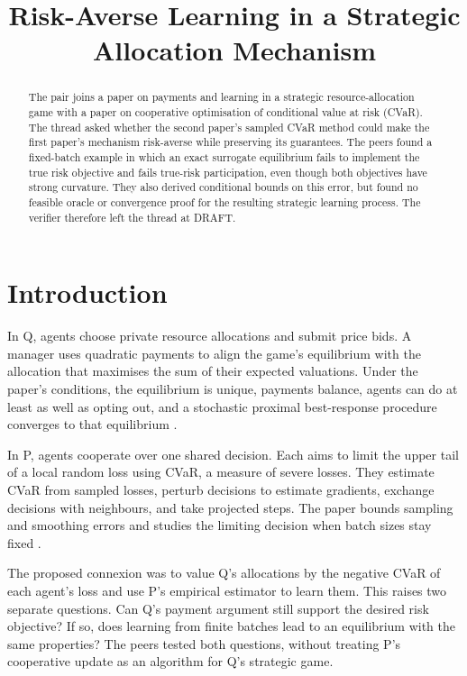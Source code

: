 \documentclass{article}
\title{Risk-Averse Learning in a Strategic Allocation Mechanism}
\begin{document}
\maketitle

\begin{abstract}
The pair joins a paper on payments and learning in a strategic resource-allocation game with a paper on
cooperative optimisation of conditional value at risk (CVaR). The thread asked whether the second paper's
sampled CVaR method could make the first paper's mechanism risk-averse while preserving its guarantees. The
peers found a fixed-batch example in which an exact surrogate equilibrium fails to implement the true risk
objective and fails true-risk participation, even though both objectives have strong curvature. They also
derived conditional bounds on this error, but found no feasible oracle or convergence proof for the
resulting strategic learning process. The verifier therefore left the thread at DRAFT.
\end{abstract}

\section{Introduction}

In Q, agents choose private resource allocations and submit price bids. A manager uses quadratic payments to
align the game's equilibrium with the allocation that maximises the sum of their expected valuations. Under
the paper's conditions, the equilibrium is unique, payments balance, agents can do at least as well as
opting out, and a stochastic proximal best-response procedure converges to that equilibrium \cite{Q}.

In P, agents cooperate over one shared decision. Each aims to limit the upper tail of a local random loss
using CVaR, a measure of severe losses. They estimate CVaR from sampled losses, perturb decisions to
estimate gradients, exchange decisions with neighbours, and take projected steps. The paper bounds sampling
and smoothing errors and studies the limiting decision when batch sizes stay fixed \cite{P}.

The proposed connexion was to value Q's allocations by the negative CVaR of each agent's loss and use P's
empirical estimator to learn them. This raises two separate questions. Can Q's payment argument still
support the desired risk objective? If so, does learning from finite batches lead to an equilibrium with the
same properties? The peers tested both questions, without treating P's cooperative update as an algorithm
for Q's strategic game.
\end{document}
